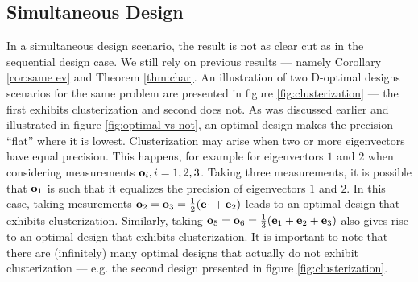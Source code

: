 \documentclass{amsart}
\numberwithin{equation}{section}
\begin{document}
\subsection{Simultaneous Design}\label{subsec:clusterization simultaneous}
In a simultaneous design scenario, the result is not as clear cut as
in the sequential design case. We still rely on previous results ---
namely Corollary \ref{cor:same ev} and Theorem \ref{thm:char}. An
illustration of two D-optimal designs scenarios for the same problem
are presented in figure \ref{fig:clusterization} --- the first
exhibits clusterization and second does not. As was discussed earlier
and illustrated in figure \ref{fig:optimal vs not}, an optimal design
makes the precision ``flat'' where it is lowest. Clusterization may
arise when two or more eigenvectors have equal precision. This
happens, for example for eigenvectors $1$ and $2$ when considering
measurements $\mathbf{o}_i,i=1,2,3$. Taking three measurements, it is
possible that $\mathbf{o}_1$ is such that it equalizes the precision of
eigenvectors $1$ and $2$. In this case, taking mesurements $\mathbf{o}_2 =
\mathbf{o}_3 = \frac{1}{2}(\mathbf{e}_1 + \mathbf{e}_2)$ leads to an optimal design that
exhibits clusterization. Similarly, taking $\mathbf{o}_5 = \mathbf{o}_6 =
\frac{1}{3}(\mathbf{e}_1 + \mathbf{e}_2 + \mathbf{e}_3)$ also gives rise to an optimal
design that exhibits clusterization. It is important to note that
there are (infinitely) many optimal designs that actually do not
exhibit clusterization --- e.g. the second design presented in figure
\ref{fig:clusterization}.
\end{document}
